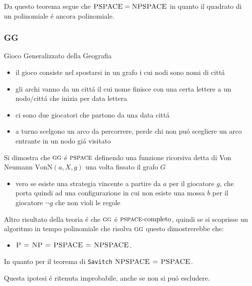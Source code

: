 \documentclass[11pt]{article}
\begin{document}
Da questo teorema segue che \(\textsc{PSPACE} =  \textsc{NPSPACE}\) in quanto il quadrato di un polinomiale é ancora polinomiale.
\subsubsection{GG}
\label{sec:org5e03d88}
Gioco Generalizzato della Geografia
\begin{itemize}
\item il gioco consiste nel spostarsi in un grafo i cui nodi sono nomi di cittá
\item gli archi vanno da un cittá il cui nome finisce con una certa lettere a un nodo/cittá che inizia per data lettera
\item ci sono due giocatori che partono da una data cittá
\item a turno scelgono un arco da percorrere, perde chi non puó scegliere un arco entrante in un nodo giá visitato
\end{itemize}

Si dimostra che \(\textsc{gg}\) é \(\textsc{pspace}\) definendo una funzione ricorsiva detta di Von Neumann \(\text{VonN}(a,X,g)\) una volta fissato il grafo \(G\)
\begin{itemize}
\item vero se esiste una strategia vincente a partire da \(a\) per il giocatore \(g\), che porta quindi ad una configurazione in cui non esiste una mossa \(b\) per il giocatore \(\lnot g\) che non violi le regole
\end{itemize}

Altro risultato della teoria é che \(\textsc{gg}\) é \(\textsc{pspace}\text{-completo}\), quindi se si scoprisse un algoritmo in tempo polinomiale che risolva \(\textsc{gg}\) questo dimostrerebbe che:
\begin{itemize}
\item \(\textsc{P = NP = PSPACE = NPSPACE}\).
\end{itemize}

In quanto per il teorema di \texttt{Savitch} \(\textsc{NPSPACE = PSPACE}\).

Questa ipotesi é ritenuta improbabile, anche se non si puó escludere.
\end{document}

